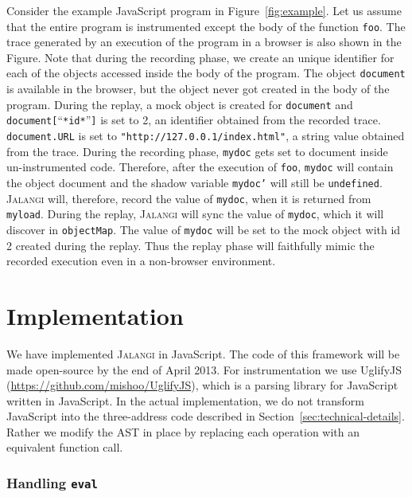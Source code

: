 \documentclass{sig-alternate}
\def\jalangi{\textsc{Jalangi}}
\begin{document}
Consider the example JavaScript program in Figure~\ref{fig:example}.
Let us assume that the entire program is instrumented except the body
of the function \texttt{foo}.  The trace generated by an execution of
the program in a browser is also shown in the Figure.  Note that
during the recording phase, we create an unique identifier for each of
the objects accessed inside the body of the program.  The object
\texttt{document} is available in the browser, but the object never
got created in the body of the program.  During the replay, a mock
object is created for \texttt{document} and
\texttt{document[}``\texttt{*id*}''\texttt{]} is set to 2, an identifier obtained from
the recorded trace.  \texttt{document.URL} is set to
\texttt{"http://127.0.0.1/index.html"}, a string value obtained from
the trace.  During the recording phase, \texttt{mydoc} gets set to
document inside un-instrumented code.  Therefore, after the execution
of \texttt{foo}, \texttt{mydoc} will contain the object document and
the shadow variable \texttt{mydoc'} will still be \texttt{undefined}.
\jalangi{} will, therefore, record the value of \texttt{mydoc}, when
it is returned from \texttt{myload}.  During the replay, \jalangi{}
will sync the value of \texttt{mydoc}, which it will discover in
\texttt{objectMap}.  The value of \texttt{mydoc} will be set to the
mock object with id 2 created during the replay.  Thus the replay
phase will faithfully mimic the recorded execution even in a
non-browser environment.

\section{Implementation}
\label{sec:implementation}

We have implemented \jalangi{} in JavaScript.  The code of this
framework will be made open-source by the end of April 2013.  For
instrumentation we use UglifyJS
(\url{https://github.com/mishoo/UglifyJS}), which is a parsing library
for JavaScript written in JavaScript.  In the actual implementation,
we do not transform JavaScript into the three-address code described
in Section~\ref{sec:technical-details}.  Rather we modify the AST in
place by replacing each operation with an equivalent function call.

\subsubsection*{Handling \texttt{eval}}
\label{sec:handling-texttteval}
\end{document}
